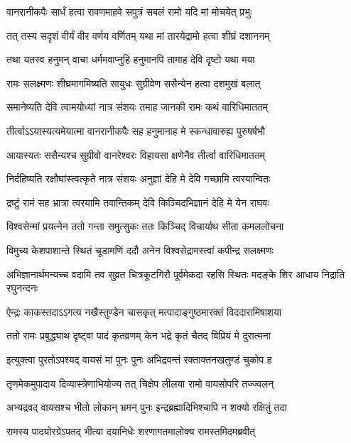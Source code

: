 \twolineshloka
{वानरानीकपैः सार्धं हत्वा रावणमाहवे}
{सपुत्रं सबलं रामो यदि मां मोचयेत् प्रभुः} %

\twolineshloka
{तत् तस्य सदृशं वीर्यं वीर वर्णय वर्णितम्}
{यथा मां तारयेद्रामो हत्वा शीघ्रं दशाननम्} %

\twolineshloka
{तथा यतस्व हनुमन् वाचा धर्ममवाप्नुहि}
{हनुमानपि तामाह देवि दृष्टो यथा मया} %

\twolineshloka
{रामः सलक्ष्मणः शीघ्रमागमिष्यति सायुधः}
{सुग्रीवेण ससैन्येन हत्वा दशमुखं बलात्} %

\twolineshloka
{समानेष्यति देवि त्वामयोध्यां नात्र संशयः}
{तमाह जानकी रामः कथं वारिधिमाततम्} %

\twolineshloka
{तीर्त्वाऽऽयास्यत्यमेयात्मा वानरानीकपैः सह}
{हनुमानाह मे स्कन्धावारुह्य पुरुषर्षभौ} %

\twolineshloka
{आयास्यतः ससैन्यश्च सुग्रीवो वानरेश्वरः}
{विहायसा क्षणेनैव तीर्त्वा वारिधिमाततम्} %

\twolineshloka
{निर्दहिष्यति रक्षौघांस्त्वत्कृते नात्र संशयः}
{अनुज्ञां देहि मे देवि गच्छामि त्वरयान्वितः} %

\twolineshloka
{द्रष्टुं रामं सह भ्रात्रा त्वरयामि तवान्तिकम्}
{देवि किञ्चिदभिज्ञानं देहि मे येन राघवः} %

\twolineshloka
{विश्वसेन्मां प्रयत्नेन ततो गन्ता समुत्सुकः}
{ततः किञ्चिद् विचार्याथ सीता कमललोचना} %

\twolineshloka
{विमुच्य केशपाशान्ते स्थितं चूडामणिं ददौ}
{अनेन विश्वसेद्रामस्त्वां कपीन्द्र सलक्ष्मणः} %

\threelineshloka
{अभिज्ञानार्थमन्यच्च वदामि तव सुव्रत}
{चित्रकूटगिरौ पूर्वमेकदा रहसि स्थितः}
{मदङ्के शिर आधाय निद्राति रघुनन्दनः} %

\twolineshloka
{ऐन्द्रः काकस्तदाऽऽगत्य नखैस्तुण्डेन चासकृत्}
{मत्पादाङ्गुष्ठमारक्तं विददारामिषाशया} %

\twolineshloka
{ततो रामः प्रबुद्ध्याथ दृष्ट्वा पादं कृतव्रणम्}
{केन भद्रे कृतं चैतद् विप्रियं मे दुरात्मना} %

\twolineshloka
{इत्युक्त्वा पुरतोऽपश्यद् वायसं मां पुनः पुनः}
{अभिद्रवन्तं रक्ताक्तनखतुण्डं चुकोप ह} %

\twolineshloka
{तृणमेकमुपादाय दिव्यास्त्रेणाभियोज्य तत्}
{चिक्षेप लीलया रामो वायसोपरि तज्ज्वलन्} %

\twolineshloka
{अभ्यद्रवद् वायसश्च भीतो लोकान् भ्रमन् पुनः}
{इन्द्रब्रह्मादिभिश्चापि न शक्यो रक्षितुं तदा} %

\twolineshloka
{रामस्य पादयोरग्रेऽपतद् भीत्या दयानिधेः}
{शरणागतमालोक्य रामस्तमिदमब्रवीत्} %

